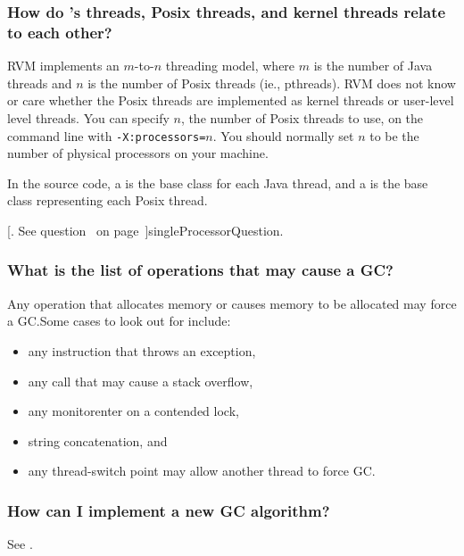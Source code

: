 \subsubsection{How do \jrvm{}'s threads, Posix threads, and kernel
threads relate to each other?}

RVM implements an $m$-to-$n$ threading model, where $m$ is the number of 
Java threads and $n$ is the number of Posix threads (ie., pthreads).  RVM
does not know or care whether the Posix threads are implemented as kernel
threads or user-level level threads.  You can specify $n$, the number of
Posix threads to use, on the command line with {\tt -X:processors=$n$}.
You should normally set $n$ to be the number of physical processors on
your machine.  

In the source code, a 
is the base class for each Java
thread, and a 
is the base class representing each
Posix thread.  

[.  See 
question~\Ref{} on page~\Pageref]{singleProcessorQuestion}.

\subsubsection{What is the list of operations that may cause a GC?}

Any operation that allocates memory or causes memory to be allocated may
force a GC.\@  Some cases to look out for include:
\begin{itemize}
\item any instruction that throws an exception,
\item any call that may cause a stack overflow,
\item any {\instruction monitorenter} on a contended lock,
\item string concatenation, and
\item any thread-switch point may allow another thread to force GC.\@
\end{itemize}

\subsubsection{How can I implement a new GC algorithm?}

See .

